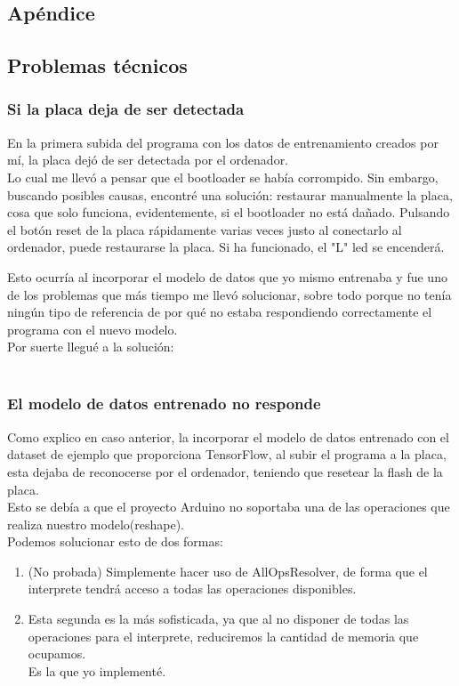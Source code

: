 \begin{mimargen}{-1cm}{-1cm}

\chapter{Apéndice}

\section{Problemas técnicos}

\subsection{Si la placa deja de ser detectada}
En la primera subida del programa con los datos de entrenamiento
creados por mí, la placa dejó de ser detectada por el ordenador.\\
Lo cual me llevó a pensar que el bootloader se había corrompido.
Sin embargo, buscando posibles causas, encontré una solución:
restaurar manualmente la placa, cosa que solo funciona, evidentemente,
si el bootloader no está dañado.
Pulsando el botón reset de la placa rápidamente varias veces justo
al conectarlo al ordenador, puede restaurarse la placa. Si ha funcionado,
el "L" led se encenderá.

Esto ocurría al incorporar el modelo de datos que yo mismo entrenaba
y fue uno de los problemas que más tiempo me llevó solucionar, sobre
todo porque no tenía ningún tipo de referencia de por qué no estaba
respondiendo correctamente el programa con el nuevo modelo.\\
Por suerte llegué a la solución:\\~\\


\subsection{El modelo de datos entrenado no responde\cite{intro-tensor-micro}}
Como explico en caso anterior, la incorporar el modelo de datos
entrenado con el dataset de ejemplo que proporciona TensorFlow,
al subir el programa a la placa, esta dejaba de reconocerse por
el ordenador, teniendo que resetear la flash de la placa.\\
Esto se debía a que el proyecto Arduino no soportaba una de las
operaciones que realiza nuestro modelo(reshape).\\
\newpage Podemos solucionar esto de dos formas:
\begin{enumerate}
    \item (No probada) Simplemente hacer uso de AllOpsResolver,
    de forma que el interprete tendrá acceso a todas las operaciones
    disponibles.
    \item Esta segunda es la más sofisticada, ya que al no disponer
    de todas las operaciones para el interprete, reduciremos la cantidad
    de memoria que ocupamos.\\Es la que yo implementé.
\end{enumerate}


\end{mimargen}
